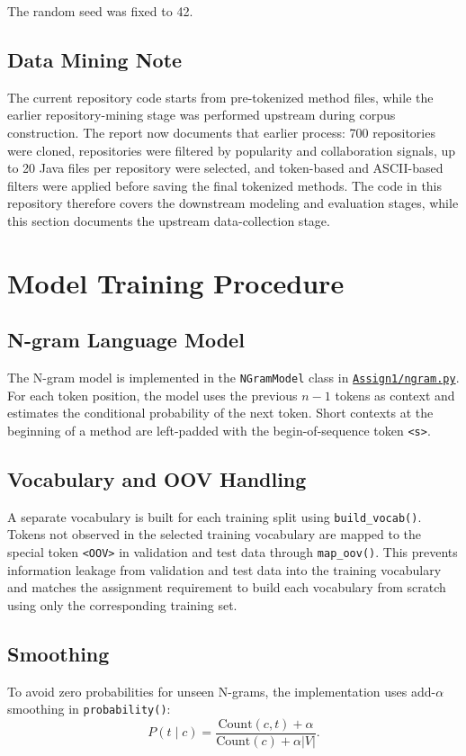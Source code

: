\documentclass[11pt]{article}
\newcommand{\repoURL}{https://github.com/ABasloe/CSCI555}
\begin{document}
The random seed was fixed to 42.

\subsection{Data Mining Note}
The current repository code starts from pre-tokenized method files, while the earlier repository-mining stage was performed upstream during corpus construction. The report now documents that earlier process: 700 repositories were cloned, repositories were filtered by popularity and collaboration signals, up to 20 Java files per repository were selected, and token-based and ASCII-based filters were applied before saving the final tokenized methods. The code in this repository therefore covers the downstream modeling and evaluation stages, while this section documents the upstream data-collection stage.

\section{Model Training Procedure}

\subsection{N-gram Language Model}
The N-gram model is implemented in the \texttt{NGramModel} class in \href{\repoURL/blob/main/Assign1/ngram.py}{\texttt{Assign1/ngram.py}}. For each token position, the model uses the previous \(n-1\) tokens as context and estimates the conditional probability of the next token. Short contexts at the beginning of a method are left-padded with the begin-of-sequence token \texttt{<s>}.

\subsection{Vocabulary and OOV Handling}
A separate vocabulary is built for each training split using \texttt{build\_vocab()}. Tokens not observed in the selected training vocabulary are mapped to the special token \texttt{<OOV>} in validation and test data through \texttt{map\_oov()}. This prevents information leakage from validation and test data into the training vocabulary and matches the assignment requirement to build each vocabulary from scratch using only the corresponding training set.

\subsection{Smoothing}
To avoid zero probabilities for unseen N-grams, the implementation uses add-\(\alpha\) smoothing in \texttt{probability()}:
\[
P(t \mid c) = \frac{\text{Count}(c,t) + \alpha}{\text{Count}(c) + \alpha |V|}.
\]
\end{document}
